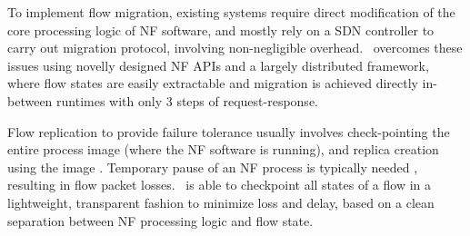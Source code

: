 
To implement flow migration, existing systems \cite{gember2015opennf}\cite{rajagopalan2013split} require direct modification of the core processing logic of NF software, and mostly rely on a SDN controller to carry out migration protocol, involving non-negligible overhead. %
\nfactor~overcomes these issues using novelly designed NF APIs and a largely distributed framework, where flow states are easily extractable and migration is achieved directly in-between runtimes with only 3 steps of request-response. %

Flow replication to provide failure tolerance usually involves check-pointing the entire process image (where the NF software is running), and replica creation using the image \cite{sherry2015rollback} \cite{rajagopalan2013pico}. Temporary pause of an NF process is typically needed \cite{sherry2015rollback}, resulting in flow packet losses.
\nfactor~is able to checkpoint all states of a flow in a lightweight, transparent fashion to minimize loss and delay, based on a clean separation between NF processing logic and flow state. %

